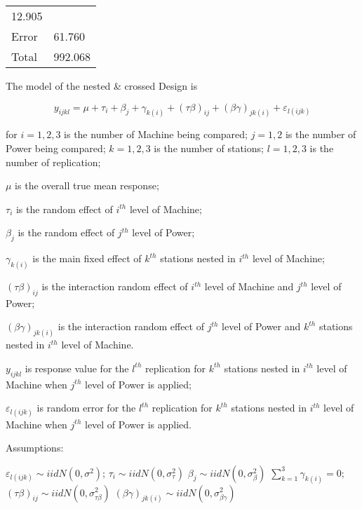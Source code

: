 \documentclass[12pt,]{article}
\begin{document}
\begin{longtable}[]{@{}ll@{}}
\begin{minipage}[t]{0.13\columnwidth}
12.905\strut
\end{minipage}\tabularnewline
\begin{minipage}[t]{0.35\columnwidth}\raggedright
Error\strut
\end{minipage} & \begin{minipage}[t]{0.13\columnwidth}\raggedright
61.760\strut
\end{minipage}\tabularnewline
\begin{minipage}[t]{0.35\columnwidth}\raggedright
Total\strut
\end{minipage} & \begin{minipage}[t]{0.13\columnwidth}\raggedright
992.068\strut
\end{minipage}\tabularnewline
\bottomrule
\end{longtable}

The model of the nested \& crossed Design is

\[y_{ijkl}=\mu+\tau_i+\beta_{j}+\gamma_{k(i)}+(\tau\beta)_{ij}+(\beta\gamma)_{jk(i)}+\varepsilon_{l(ijk)}\]

for \(i=1,2,3\) is the number of Machine being compared; \(j=1,2\) is
the number of Power being compared; \(k=1,2,3\) is the number of
stations; \(l=1,2,3\) is the number of replication;

\(\mu\) is the overall true mean response;

\(\tau_i\) is the random effect of \(i^{th}\) level of Machine;

\(\beta_{j}\) is the random effect of \(j^{th}\) level of Power;

\(\gamma_{k(i)}\) is the main fixed effect of \(k^{th}\) stations nested
in \(i^{th}\) level of Machine;

\((\tau\beta)_{ij}\) is the interaction random effect of \(i^{th}\)
level of Machine and \(j^{th}\) level of Power;

\((\beta\gamma)_{jk(i)}\) is the interaction random effect of \(j^{th}\)
level of Power and \(k^{th}\) stations nested in \(i^{th}\) level of
Machine.

\(y_{ijkl}\) is response value for the \(l^{th}\) replication for
\(k^{th}\) stations nested in \(i^{th}\) level of Machine when
\(j^{th}\) level of Power is applied;

\(\varepsilon_{l(ijk)}\) is random error for the \(l^{th}\) replication
for \(k^{th}\) stations nested in \(i^{th}\) level of Machine when
\(j^{th}\) level of Power is applied.

Assumptions:

\(\varepsilon_{l(ijk)}\sim iid N(0,\sigma^2)\);
\(\tau_{i}\sim iid N(0,\sigma_{\tau}^2)\)
\(\beta_{j}\sim iid N(0,\sigma_{\beta}^2)\)
\(\sum_{k=1}^3\gamma_{k(i)}=0\);
\((\tau\beta)_{ij}\sim iid N(0,\sigma_{\tau\beta}^2)\)
\((\beta\gamma)_{jk(i)}\sim iid N(0,\sigma_{\beta\gamma}^2)\)
\end{document}
